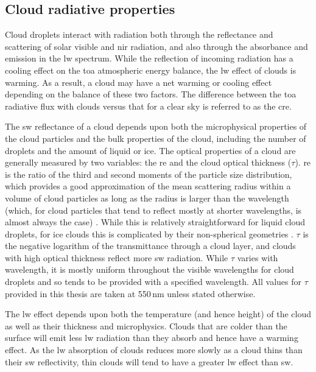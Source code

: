 \subsection{Cloud radiative properties}

Cloud droplets interact with radiation both through the reflectance and scattering of solar visible and \acrfull{nir} radiation, and also through the absorbance and emission in the \acrshort{lw} spectrum.
While the reflection of incoming radiation has a cooling effect on the \acrfull{toa} atmospheric energy balance, the \acrshort{lw} effect of clouds is warming.
As a result, a cloud may have a net warming or cooling effect depending on the balance of these two factors.
The difference between the \acrshort{toa} radiative flux with clouds versus that for a clear sky is referred to as the \acrshort{cre}.

The \acrshort{sw} reflectance of a cloud depends upon both the microphysical properties of the cloud particles and the bulk properties of the cloud, including the number of droplets and the amount of liquid or ice.
The optical properties of a cloud are generally measured by two variables: the \acrfull{re} and the cloud optical thickness ($\tau$).
\acrshort{re} is the ratio of the third and second moments of the particle size distribution, which provides a good approximation of the mean scattering radius within a volume of cloud particles as long as the radius is larger than the wavelength (which, for cloud particles that tend to reflect mostly at shorter wavelengths, is almost always the case) \citep{hansen_light_1974}. 
While this is relatively straightforward for liquid cloud droplets, for ice clouds this is complicated by their non-spherical geometries \citep{wyser_effective_1998}.
$\tau$ is the negative logarithm of the transmittance through a cloud layer, and clouds with high optical thickness reflect more \acrshort{sw} radiation.
While $\tau$ varies with wavelength, it is mostly uniform throughout the visible wavelengths for cloud droplets and so tends to be provided with a specified wavelength.
All values for $\tau$ provided in this thesis are taken at 550\,\unit{nm} unless stated otherwise.

The \acrshort{lw} effect depends upon both the temperature (and hence height) of the cloud as well as their thickness and microphysics.
Clouds that are colder than the surface will emit less \acrshort{lw} radiation than they absorb and hence have a warming effect.
As the \acrshort{lw} absorption of clouds reduces more slowly as a cloud thins than their \acrshort{sw} reflectivity, thin clouds will tend to have a greater \acrshort{lw} effect than \acrshort{sw}.

